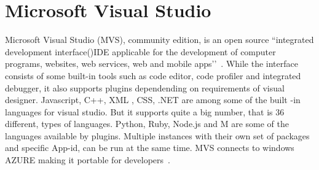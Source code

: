 \section{Microsoft Visual Studio}

Microsoft Visual Studio (MVS), community edition, is an open source ``integrated
development interface()IDE applicable for the development of computer programs, 
websites, web services, web and mobile apps’’~\cite{hid-sp18-415-wikipedia-org}. While 
the interface consists of some built-in tools such as code editor, code profiler
and integrated debugger, it also supports plugins dependending on  requirements 
of visual designer. Javascript, C++, XML , CSS, .NET are among some of the 
built -in languages for visual studio. But it supports quite a big number, 
that is 36 different, types of languages. Python, Ruby, Node.js and M are 
some of the languages available by plugins.  Multiple instances with their own
set of packages and specific App-id, can be run at the same time. MVS 
connects to windows AZURE making it portable for
developers~\cite{hid-sp18-415-wikipedia-org}.

